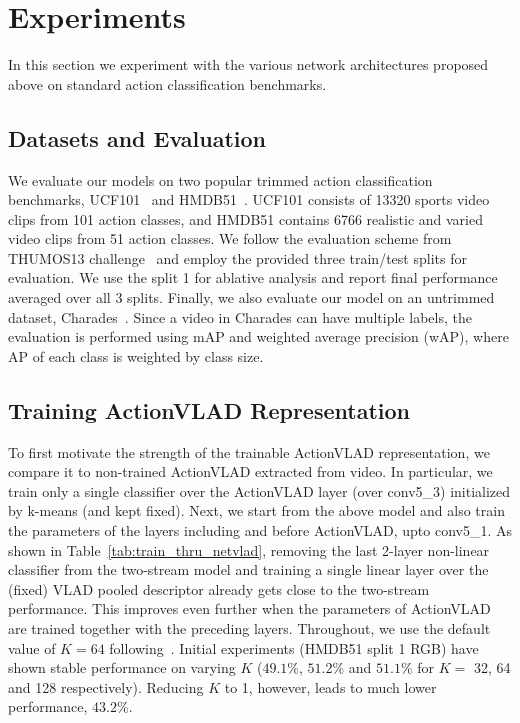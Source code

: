 \documentclass[10pt,twocolumn,letterpaper]{article}
\newcommand{\methodTag}[0]{ActionVLAD}
\begin{document}
 \section{Experiments}

In this section we experiment with the various network
architectures proposed above on standard
action classification benchmarks.

\subsection{Datasets and Evaluation}
We evaluate our models on two popular trimmed action
classification benchmarks,
UCF101~\cite{ucf101} and HMDB51~\cite{hmdb51}.
UCF101 consists of 13320 sports video clips
from 101 action classes,
and HMDB51 contains 6766 realistic and varied video clips from
51 action classes. We follow the evaluation
scheme from THUMOS13 challenge~\cite{THUMOS13} and
employ the provided three train/test splits for
evaluation.
We use the split 1 for ablative analysis and
report final performance averaged over all 3 splits.
Finally, we also evaluate our model on an
untrimmed dataset, Charades~\cite{charades}.
Since a video in Charades can have multiple labels,
the evaluation is performed using mAP and weighted
average precision (wAP), where AP of each class
is weighted by class size.

\subsection{Training \methodTag{} Representation}

To first motivate the strength of the trainable \methodTag{} representation,
we compare it to non-trained \methodTag{} extracted from video.
In particular, we train only a single classifier over the \methodTag{} layer (over conv5\_3) initialized by k-means (and kept fixed).
Next, we start from the above model 
and also train the parameters of the 
layers including and before \methodTag{},
upto conv5\_1. As shown in Table~\ref{tab:train_thru_netvlad}, 
removing the last 2-layer non-linear classifier from the
two-stream model and training a single 
linear layer over the (fixed) VLAD pooled
descriptor already gets close to the two-stream performance.
This improves even further when the parameters of \methodTag{} are trained together with the preceding layers.
Throughout, we use the default value of $K=64$
following~\cite{Arandjelovic16}. Initial 
experiments (HMDB51 split 1 RGB) have shown stable 
performance on varying $K$
($49.1\%$, $51.2\%$ and $51.1\%$ for $K=$
32, 64 and 128 respectively).
Reducing $K$ to 1, however, leads
to much lower performance, $43.2\%$.
\end{document}
